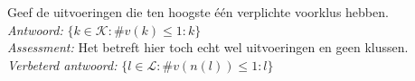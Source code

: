 
\item Geef de uitvoeringen die ten hoogste \'{e}\'{e}n verplichte voorklus hebben. \\


\emph{Antwoord:} $\{ k \in \mathcal{K} : \#v(k) \leq 1 : k \}$ \\
\emph{Assessment:} Het betreft hier toch echt wel uitvoeringen en geen klussen. \\

\emph{Verbeterd antwoord:} $\{ l \in \mathcal{L} : \#v(n(l)) \leq 1 : l \}$ \\
